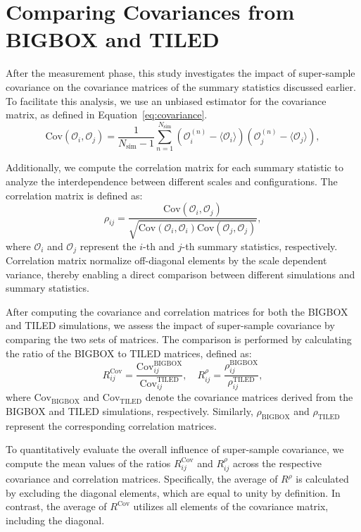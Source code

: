 \section{Comparing Covariances from BIGBOX and TILED}
After the measurement phase, this study investigates the impact of super-sample covariance on the covariance matrices of the summary statistics discussed earlier. To facilitate this analysis, we use an unbiased estimator for the covariance matrix, as defined in Equation~\ref{eq:covariance}.
\begin{equation}
    \label{eq:covariance}
    \mathrm{Cov}(\mathcal{O}_i, \mathcal{O}_j) = \frac{1}{N_{\mathrm{sim}} - 1} \sum_{n=1}^{N_{\mathrm{sim}}} (\mathcal{O}_i^{(n)} - \langle \mathcal{O}_i \rangle) (\mathcal{O}_j^{(n)} - \langle \mathcal{O}_j \rangle),
\end{equation}

Additionally, we compute the correlation matrix for each summary statistic to analyze the interdependence between different scales and configurations. The correlation matrix is defined as:
\begin{equation}
    \rho_{ij} = \frac{\text{Cov}(\mathcal{O}_i, \mathcal{O}_j)}{\sqrt{\text{Cov}(\mathcal{O}_i, \mathcal{O}_i)\text{Cov}(\mathcal{O}_j, \mathcal{O}_j)}},
\end{equation}
where $\mathcal{O}_i$ and $\mathcal{O}_j$ represent the $i$-th and $j$-th summary statistics, respectively. Correlation matrix normalize off-diagonal elements by the scale dependent variance, thereby enabling a direct comparison between different simulations and summary statistics.

After computing the covariance and correlation matrices for both the BIGBOX and TILED simulations, we assess the impact of super-sample covariance by comparing the two sets of matrices. The comparison is performed by calculating the ratio of the BIGBOX to TILED matrices, defined as:
\begin{equation}
    R^{\mathrm{Cov}}_{ij} = \frac{\mathrm{Cov}^{\mathrm{BIGBOX}}_{ij}}{\mathrm{Cov}^{\mathrm{TILED}}_{ij}}, \quad R^{\rho}_{ij} = \frac{\rho^{\mathrm{BIGBOX}}_{ij}}{\rho^{\mathrm{TILED}}_{ij}},
\end{equation}
where $\mathrm{Cov}_{\mathrm{BIGBOX}}$ and $\mathrm{Cov}_{\mathrm{TILED}}$ denote the covariance matrices derived from the BIGBOX and TILED simulations, respectively. Similarly, $\rho_{\mathrm{BIGBOX}}$ and $\rho_{\mathrm{TILED}}$ represent the corresponding correlation matrices.

To quantitatively evaluate the overall influence of super-sample covariance, we compute the mean values of the ratios $R^{\mathrm{Cov}}_{ij}$ and $R^{\rho}_{ij}$ across the respective covariance and correlation matrices. Specifically, the average of $R^{\rho}$ is calculated by excluding the diagonal elements, which are equal to unity by definition. In contrast, the average of $R^{\mathrm{Cov}}$ utilizes all elements of the covariance matrix, including the diagonal. 

